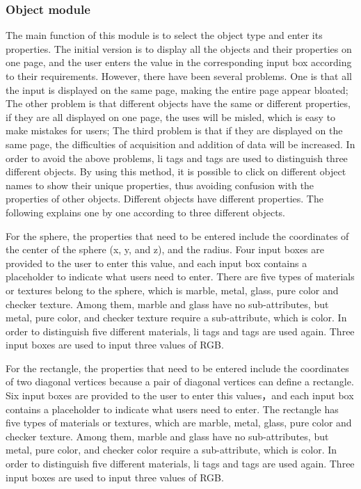 \documentclass[11pt]{article}
\begin{document}
\subsubsection{Object module}
The main function of this module is to select the object type and enter its properties. 
The initial version is to display all the objects and their properties on one page, and the user enters the value in the corresponding input box according to their requirements. However, there have been several problems. One is that all the input is displayed on the same page, making the entire page appear bloated; The other problem is that different objects have the same or different properties, if they are all displayed on one page, the uses will be misled, which is easy to make mistakes for users; The third problem is that if they are displayed on the same page, the difficulties of acquisition and addition of data will be increased.
In order to avoid the above problems, li tags and tags are used to distinguish three different objects. By using this method, it is possible to click on different object names to show their unique properties, thus avoiding confusion with the properties of other objects.
Different objects have different properties. The following explains one by one according to three different objects.

For the sphere, the properties that need to be entered include the coordinates of the center of the sphere (x, y, and z), and the radius. Four input boxes are provided to the user to enter this value, and each input box contains a placeholder to indicate what users need to enter.
There are five types of materials or textures belong to the sphere, which is marble, metal, glass, pure color and checker texture. Among them, marble and glass have no sub-attributes, but metal, pure color, and checker texture require a sub-attribute, which is color. In order to distinguish five different materials, li tags and tags are used again. Three input boxes are used to input three values of RGB.

For the rectangle, the properties that need to be entered include the coordinates of two diagonal vertices because a pair of diagonal vertices can define a rectangle. Six input boxes are provided to the user to enter this values，and each input box contains a placeholder to indicate what users need to enter.
The rectangle has five types of materials or textures, which are marble, metal, glass, pure color and checker texture. Among them, marble and glass have no sub-attributes, but metal, pure color, and checker color require a sub-attribute, which is color. In order to distinguish five different materials, li tags and tags are used again. Three input boxes are used to input three values of RGB.
\end{document}
